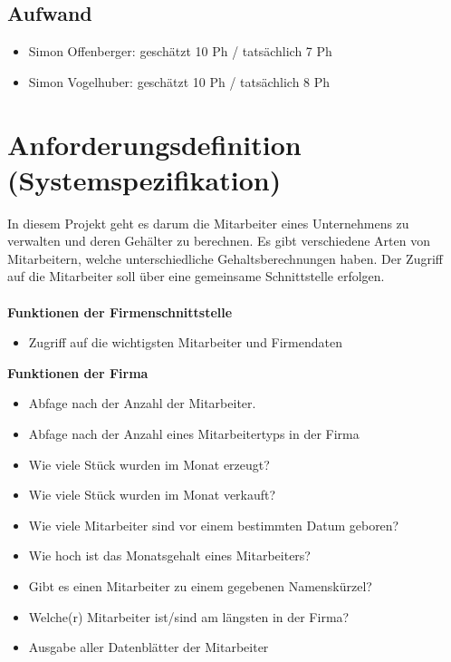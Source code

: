 \documentclass[12pt,naustrian,a4widepaper]{scrartcl}
\begin{document}
\subsection{Aufwand}
	
	\begin{itemize}
		\item Simon Offenberger: geschätzt 10 Ph / tatsächlich 7 Ph
		\item Simon Vogelhuber:  geschätzt 10 Ph / tatsächlich 8 Ph
	\end{itemize}

\clearpage
\section{Anforderungsdefinition (Systemspezifikation)}
In diesem Projekt geht es darum die Mitarbeiter eines Unternehmens zu verwalten und deren Gehälter zu berechnen.
Es gibt verschiedene Arten von Mitarbeitern, welche unterschiedliche Gehaltsberechnungen haben. 
Der Zugriff auf die Mitarbeiter soll über eine gemeinsame Schnittstelle erfolgen.
\\
\\
\textbf{Funktionen der Firmenschnittstelle}
\begin{itemize}
	\item Zugriff auf die wichtigsten Mitarbeiter und Firmendaten
\end{itemize}

\textbf{Funktionen der Firma}
\begin{itemize}
 \item Abfage nach der Anzahl der Mitarbeiter.
 \item Abfage nach der Anzahl eines Mitarbeitertyps in der Firma
 \item Wie viele Stück wurden im Monat erzeugt?
 \item Wie viele Stück wurden im Monat verkauft?
 \item Wie viele Mitarbeiter sind vor einem bestimmten Datum geboren?
 \item Wie hoch ist das Monatsgehalt eines Mitarbeiters?
 \item Gibt es einen Mitarbeiter zu einem gegebenen Namenskürzel?
 \item Welche(r) Mitarbeiter ist/sind am längsten in der Firma?
 \item Ausgabe aller Datenblätter der Mitarbeiter
\end{itemize}
\end{document}
